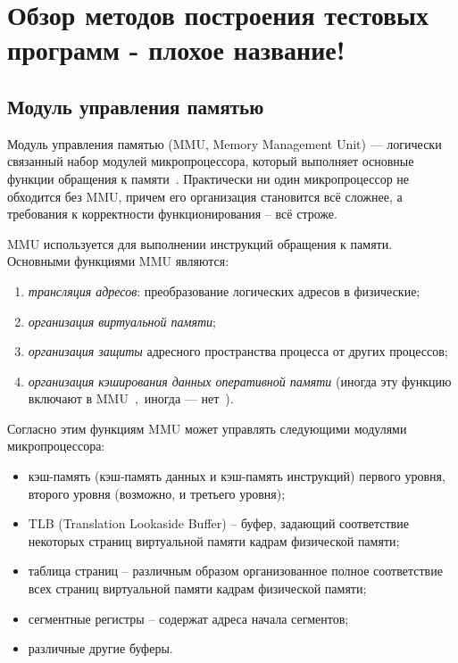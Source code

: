 \chapter{Обзор методов построения тестовых программ - плохое название!}

\section{Модуль управления памятью}

Модуль управления памятью (MMU, Memory Management Unit) ---
логически связанный набор модулей микропроцессора, который выполняет
основные функции обращения к памяти~\cite{MMU}. Практически ни один
микропроцессор не обходится без MMU, причем его организация
становится всё сложнее, а требования к корректности функционирования
-- всё строже.

MMU используется для выполнении инструкций обращения к памяти.
Основными функциями MMU являются:
\begin{enumerate}
  \item \emph{трансляция адресов}: преобразование логических адресов
  в физические;
  \item \emph{организация виртуальной памяти};
  \item \emph{организация защиты} адресного пространства процесса от
  других процессов;
  \item \emph{организация кэширования данных оперативной памяти}
  (иногда эту функцию включают в MMU~\cite{vorobyev},~иногда ---
  нет~\cite{thompson}).
\end{enumerate}

Согласно этим функциям MMU может управлять следующими модулями
микропроцессора:
\begin{itemize}
  \item кэш-память (кэш-память данных и кэш-память инструкций)
  первого уровня, второго уровня (возможно, и третьего уровня);
  \item TLB (Translation Lookaside Buffer) -- буфер, задающий
  соответствие некоторых страниц виртуальной памяти кадрам
  физической памяти;
  \item таблица страниц -- различным образом организованное полное
  соответствие всех страниц виртуальной памяти кадрам физической
  памяти;
  \item сегментные регистры -- содержат адреса начала сегментов;
  \item различные другие буферы.
\end{itemize}

